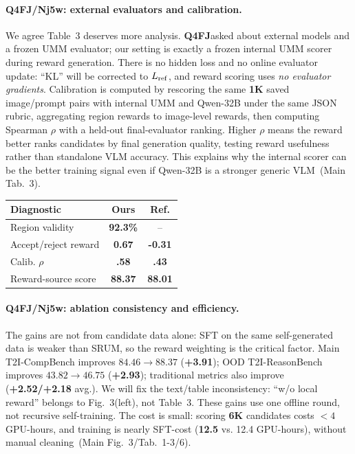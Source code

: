 \documentclass[10pt,twocolumn,letterpaper]{article}
\newcommand{\RQ}{\textcolor{revred}{\textbf{Q4FJ}}}
\newcommand{\RN}{\textcolor{revblue}{\textbf{Nj5w}}}
\newcommand{\good}[1]{\textcolor{revgreen}{\textbf{#1}}}
\newcommand{\crit}[1]{\textcolor{revred}{\textbf{#1}}}
\newcommand{\src}[1]{\textcolor{revblue}{\footnotesize\,(#1)}}
\newcommand{\tightpara}[1]{\vspace{-0.9em}\paragraph{#1}\vspace{-0.25em}}
\begin{document}
\tightpara{\RQ/\RN: external evaluators and calibration.}
We agree Table~3 deserves more analysis. \RQ asked about external models and a frozen UMM evaluator; our setting is exactly a frozen internal UMM scorer during reward generation. There is no hidden loss and no online evaluator update: ``KL'' will be corrected to \(L_{\rm ref}\), and reward scoring uses \emph{no evaluator gradients}. Calibration is computed by rescoring the same \good{1K} saved image/prompt pairs with internal UMM and Qwen-32B under the same JSON rubric, aggregating region rewards to image-level rewards, then computing Spearman \(\rho\) with a held-out final-evaluator ranking. Higher \(\rho\) means the reward better ranks candidates by final generation quality, testing reward usefulness rather than standalone VLM accuracy. This explains why the internal scorer can be the better training signal even if Qwen-32B is a stronger generic VLM \src{Main Tab.~3}.
\vspace{-0.45em}
\begin{center}
\scriptsize
\setlength{\tabcolsep}{2pt}
\renewcommand{\arraystretch}{0.9}
\begin{tabular*}{0.94\columnwidth}{@{\extracolsep{\fill}}lcc@{}}
\toprule
\textbf{Diagnostic} & \textbf{Ours} & \textbf{Ref.}\\
\midrule
Region validity & \good{92.3\%} & --\\
Accept/reject reward & \good{0.67} & \crit{-0.31}\\
Calib. \(\rho\) & \good{.58} & \crit{.43}\\
Reward-source score & \good{88.37} & \crit{88.01}\\
\bottomrule
\end{tabular*}
\end{center}
\vspace{-0.8em}

\tightpara{\RQ/\RN: ablation consistency and efficiency.}
The gains are not from candidate data alone: SFT on the same self-generated data is weaker than SRUM, so the reward weighting is the critical factor. Main T2I-CompBench improves \good{\(84.46\!\to\!88.37\)} (\good{+3.91}); OOD T2I-ReasonBench improves \good{\(43.82\!\to\!46.75\)} (\good{+2.93}); traditional metrics also improve (\good{+2.52/+2.18} avg.). We will fix the text/table inconsistency: ``w/o local reward'' belongs to Fig.~3(left), not Table~3. These gains use one offline round, not recursive self-training. The cost is small: scoring \good{6K} candidates costs \good{\(<4\)} GPU-hours, and training is nearly SFT-cost (\good{12.5} vs. 12.4 GPU-hours), without manual cleaning \src{Main Fig.~3/Tab.~1-3/6}.
\end{document}

